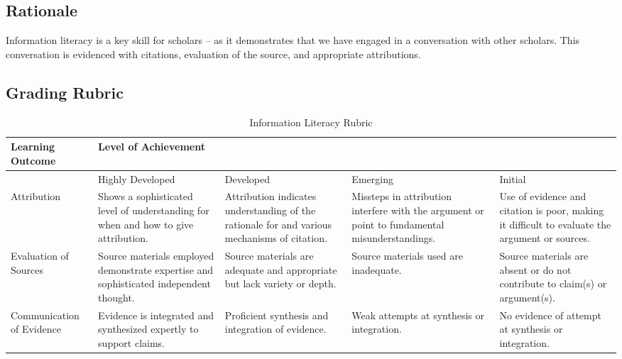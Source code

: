 \documentclass{article}\usepackage[]{graphicx}\usepackage[]{color}
\begin{document}
\subsection{Rationale}

Information literacy is a key skill for scholars -- as it demonstrates that we have engaged in a conversation with other scholars. This conversation is evidenced with citations, evaluation of the source, and appropriate attributions.

\subsection{Grading Rubric}

\begin{table}
	\centering
		\caption{Information Literacy Rubric}
	\label{tab:InformationRubric}
	
		\begin{tabular}{p{2.2cm}p{3cm}p{3cm}p{3cm}p{3cm}}\hline
	Learning Outcome	&  Level of Achievement &&& \\ \hline\hline
										& Highly Developed	& Developed	& Emerging & Initial \\ \hline
Attribution					& 
										
Shows a sophisticated level of understanding for when and how to give attribution.&

Attribution indicates understanding of the rationale for and various mechanisms of citation.&

Missteps in attribution interfere with the argument or point to fundamental misunderstandings.&

Use of evidence and citation is poor, making it difficult to evaluate the argument or sources. \\

Evaluation of Sources & 

Source materials employed demonstrate expertise and sophisticated independent thought. &

Source materials are adequate and appropriate but lack variety or depth. &

Source materials used are inadequate.&

Source materials are absent or do not contribute to claim(s) or argument(s). \\


Communication of Evidence &

Evidence is integrated and synthesized expertly to support claims. &

Proficient synthesis and integration of evidence. & 

Weak attempts at synthesis or integration. &

No evidence of attempt at synthesis or integration. \\ 
\hline
		\end{tabular}

\end{table}
\end{document}
